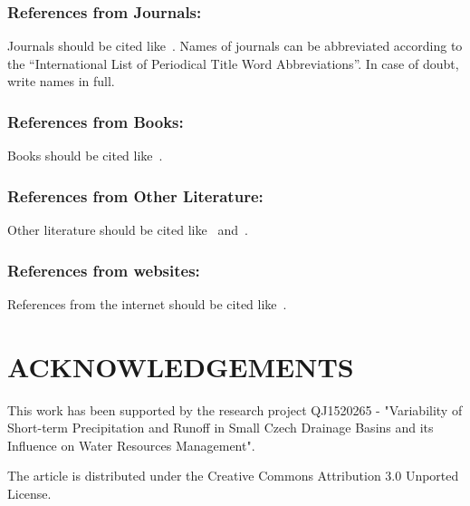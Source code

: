 \documentclass{isprs}
\begin{document}
\subsubsection{References from Journals:} 
Journals should be cited like~\cite{smith1987art}. Names of journals can be abbreviated according to the ``International List of Periodical Title Word Abbreviations''. In case of doubt, write names in full.

\subsubsection{References from Books:} 
Books should be cited like~\cite{smith1989}.

\subsubsection{References from Other Literature:}
Other literature should be cited like~\cite{smith1987rep} and~\cite{smith2000}.

\subsubsection{References from websites:}
References from the internet should be cited like~\cite{moons1997}.

\section*{ACKNOWLEDGEMENTS}\label{ACKNOWLEDGEMENTS}

This work has been supported by the research project QJ1520265 -
"Variability of Short-term Precipitation and Runoff in Small Czech
Drainage Basins and its Influence on Water Resources Management".

The article is distributed under the Creative Commons Attribution 3.0
Unported License.







\end{document}

